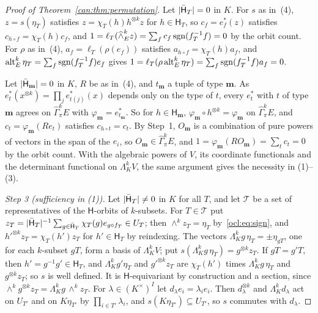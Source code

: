\begin{proof}[Proof of Theorem~\ref{can:thm:permutation}]
Let $\lvert \bar{\mathsf H}_T\rvert=0$ in $K$. For $s$ as in~(4), $z=s(\eta_T)$ satisfies $z=\chi_T(h)h^{\otimes k}z$ for
$h\in\mathsf H_T$, so $c_f=e^*_f(z)$ satisfies $c_{h\circ f}=\chi_T(h)c_f$, and
$1=\ell_T(\widehat\wedge^k_Ez)=\sum_fc_f\operatorname{sgn}(f_T^{-1}f)=0$ by the orbit count. For $\rho$ as in~(4),
$a_f=\ell_T(\rho(e_f))$ satisfies $a_{h\circ f}=\chi_T(h)a_f$, and $\operatorname{alt}^k_E\eta_T=\sum_f\operatorname{sgn}(f_T^{-1}f)e_f$ gives
$1=\ell_T(\rho\operatorname{alt}^k_E\eta_T)=\sum_f\operatorname{sgn}(f_T^{-1}f)a_f=0$.

Let $\lvert \bar{\mathsf H}_{\mathbf m}\rvert=0$ in $K$, $R$ be as in~(4), and $t_{\mathbf m}$ a tuple of type $\mathbf m$. As
$e^*_t(x^{\otimes k})=\prod_je^*_{t(j)}(x)$ depends only on the type of $t$, every $e^*_t$ with $t$ of type $\mathbf m$
agrees on $\widehat\Gamma^k_\pi E$ with $\varphi_{\mathbf m}=e^*_{t_{\mathbf m}}$. So for $h\in\mathsf H_{\mathbf m}$,
$\varphi_{\mathbf m}\circ h^{\otimes k}=\varphi_{\mathbf m}$ on $\widehat\Gamma^k_\pi E$, and $c_t=\varphi_{\mathbf
m}(Re_t)$ satisfies $c_{h\circ t}=c_t$. By Step~1, $O_{\mathbf m}$ is a combination of pure powers
of vectors in the span of the $e_i$, so $O_{\mathbf m}\in\widehat\Gamma^k_\pi E$, and $1=\varphi_{\mathbf m}(RO_{\mathbf
m})=\sum_tc_t=0$ by the orbit count. With the algebraic powers of $V$, its coordinate functionals and the determinant
functional on $\Lambda^k_KV$, the same argument gives the necessity in (1)--(3).

\emph{Step 3 (sufficiency in (1)).} Let $\lvert \bar{\mathsf H}_T\rvert\ne0$ in $K$ for all $T$, and let $\mathcal T$ be a
set of representatives of the $\mathsf H$-orbits of $k$-subsets. For $T\in\mathcal T$ put $z_T=\lvert \bar{\mathsf
H}_T\rvert^{-1}\sum_{g\in\bar{\mathsf H}_T}\chi_T(g)e_{g\circ f_T}\in U_T$; then $\wedge^kz_T=\eta_T$ by~\eqref{ocl:eq:sign},
and $h'^{\otimes k}z_T=\chi_T(h')z_T$ for $h'\in\mathsf H_T$ by reindexing. The vectors
$\Lambda^k_Kg\,\eta_T=\pm\eta_{gT}$, one for each $k$-subset $gT$, form a basis of $\Lambda^k_KV$; put
$s(\Lambda^k_Kg\,\eta_T)=g^{\otimes k}z_T$. If $gT=g'T$, then $h'=g^{-1}g'\in\mathsf H_T$, and $\Lambda^k_Kg'\eta_T$ and
$g'^{\otimes k}z_T$ are $\chi_T(h')$ times $\Lambda^k_Kg\,\eta_T$ and $g^{\otimes k}z_T$; so $s$ is well defined. It is
$\mathsf H$-equivariant by construction and a section, since $\wedge^kg^{\otimes k}z_T=\Lambda^k_Kg\,\wedge^kz_T$. For
$\lambda\in(K^\times)^I$ let $d_\lambda e_i=\lambda_ie_i$. Then $d_\lambda^{\otimes k}$ and $\Lambda^k_Kd_\lambda$ act
on $U_{T'}$ and on $K\eta_{T'}$ by $\prod_{i\in T'}\lambda_i$, and $s(K\eta_{T'})\subseteq U_{T'}$, so $s$ commutes with
$d_\lambda$.


\end{proof}
